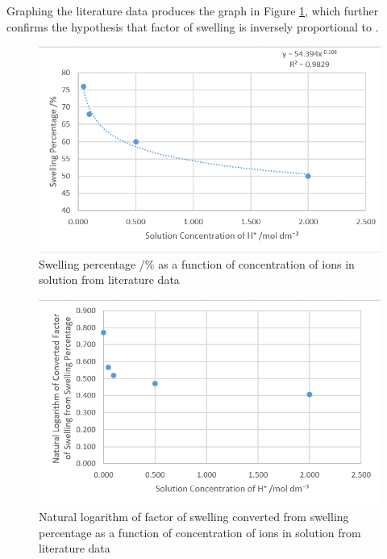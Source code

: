 \documentclass[11pt, letterpaper]{article}
\begin{document}
Graphing the literature data produces the graph in Figure \ref*{fig:procLiterature},
which further confirms the hypothesis that factor of swelling
is inversely proportional to \ce{[H+]}.

\begin{paracol}{2}
    \begin{figure}[H]
        \centering
        \includegraphics[width=\linewidth]{procLiterature.png}
        \caption{Swelling percentage /\% as a function of concentration of  ions in solution from literature data \protect\cite{ramavaraprasadSwellingCharacteristicsSoils2018a}}
        \label{fig:procLiterature}
    \end{figure}
    \switchcolumn
    \begin{figure}[H]
        \centering
        \includegraphics[width=\linewidth]{lnLiterature.png}
        \caption{Natural logarithm of factor of swelling converted from swelling percentage as a function of concentration of  ions in solution from literature data \protect\cite{ramavaraprasadSwellingCharacteristicsSoils2018a}}
        \label{fig:lnLiterature}
    \end{figure}
\end{paracol}
\end{document}
